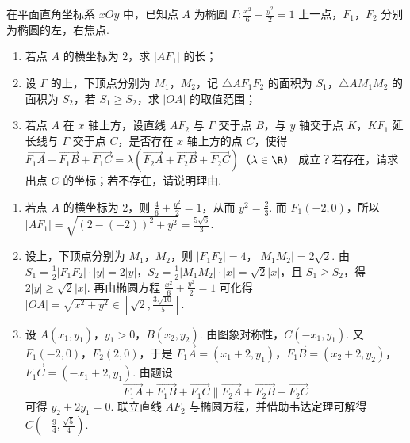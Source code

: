 \begin{problem}
在平面直角坐标系 \(xOy\) 中，已知点 \(A\) 为椭圆 \(\Gamma:\frac{x^2}{6}+\frac{y^2}{2}=1\) 上一点，\(F_1\)，\(F_2\) 分别为椭圆的左，右焦点.

\begin{enumerate}
\item 若点 \(A\) 的横坐标为 \(2\)，求 \(\left|AF_1\right|\) 的长；
\item 设 \(\Gamma\) 的上，下顶点分别为 \(M_1\)，\(M_2\)，记 \(\triangle AF_1F_2\) 的面积为 \(S_1\)，\(\triangle AM_1M_2\) 的面积为 \(S_2\)，若 \(S_1\ge S_2\)，求 \(\left|OA\right|\) 的取值范围；
\item 若点 \(A\) 在 \(x\) 轴上方，设直线 \(AF_2\) 与 \(\Gamma\) 交于点 \(B\)，与 \(y\) 轴交于点 \(K\)，\(KF_1\) 延长线与 \(\Gamma\) 交于点 \(C\)，是否存在 \(x\) 轴上方的点 \(C\)，使得 \(\overrightarrow{F_1A}+\overrightarrow{F_1B}+\overrightarrow{F_1C} =\lambda\left(\overrightarrow{F_2A}+\overrightarrow{F_2B}+\overrightarrow{F_2C}\right)\)（\(\lambda\in\R\)）
成立？若存在，请求出点 \(C\) 的坐标；若不存在，请说明理由.
\end{enumerate}
\end{problem}

\begin{solution}
\begin{enumerate}
\item 若点 \(A\) 的横坐标为 \(2\)，则 \(\frac{4}{6}+\frac{y^2}{2}=1\)，从而 \(y^2=\frac23\). 而 \(F_1(-2,0)\)，所以 \(\left|AF_1\right|=\sqrt{\left(2-(-2)\right)^2+y^2}=\frac{5\sqrt6}{3}\).

\item 设上，下顶点分别为 \(M_1\)，\(M_2\)，则 \(\left|F_1F_2\right|=4\)，\(\left|M_1M_2\right|=2\sqrt2\). 由 \(S_1=\frac12\left|F_1F_2\right|\cdot |y|=2|y|\)，\(S_2=\frac12\left|M_1M_2\right|\cdot |x|=\sqrt2|x|\)，且 \(S_1\ge S_2\)，得 \(2|y|\ge \sqrt2|x|\). 再由椭圆方程
\(\frac{x^2}{6}+\frac{y^2}{2}=1\)
可化得
\(\left|OA\right|=\sqrt{x^2+y^2}\in\left[\sqrt2,\frac{3\sqrt{10}}{5}\right]\).

\item 设 \(A(x_1,y_1)\)，\(y_1>0\)，\(B(x_2,y_2)\). 由图象对称性，\(C(-x_1,y_1)\). 又 \(F_1(-2,0)\)，\(F_2(2,0)\)，于是 \(\overrightarrow{F_1A}=\left(x_1+2,y_1\right)\)，\(\overrightarrow{F_1B}=\left(x_2+2,y_2\right)\)，\(\overrightarrow{F_1C}=\left(-x_1+2,y_1\right)\). 由题设
\[
\overrightarrow{F_1A}+\overrightarrow{F_1B}+\overrightarrow{F_1C}
\parallel
\overrightarrow{F_2A}+\overrightarrow{F_2B}+\overrightarrow{F_2C}
\]
可得 \(y_2+2y_1=0\). 联立直线 \(AF_2\) 与椭圆方程，并借助韦达定理可解得 \(C\left(-\frac94,\frac{\sqrt5}{4}\right)\).
\end{enumerate}
\end{solution}

